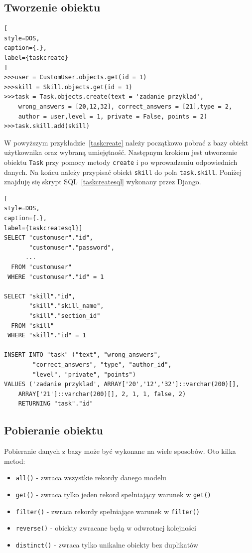 \documentclass[oneside,polski,logo,indent]{amuthesis}
\begin{document}
\begin{center}
\subsection{Tworzenie obiektu}
\end{center}
\begin{lstlisting}[
style=DOS,
caption={.},
label={taskcreate}
]
>>>user = CustomUser.objects.get(id = 1)
>>>skill = Skill.objects.get(id = 1)
>>>task = Task.objects.create(text = 'zadanie przyklad',
	wrong_answers = [20,12,32], correct_answers = [21],type = 2,
	author = user,level = 1, private = False, points = 2)
>>>task.skill.add(skill)

\end{lstlisting}
W powyższym przykładzie~\ref{taskcreate} należy początkowo pobrać z bazy obiekt użytkownika oraz wybraną umiejętność. Następnym krokiem jest utworzenie obiektu \texttt{Task} przy pomocy metody \texttt{create} i po wprowadzeniu odpowiednich danych. Na końcu należy przypisać obiekt \texttt{skill} do pola \texttt{task.skill}. Poniżej znajduję się skrypt SQL~\ref{taskcreatesql} wykonany przez Django.
\begin{lstlisting}[
style=DOS,
caption={.},
label={taskcreatesql}]
SELECT "customuser"."id",
       "customuser"."password",
	  ...
  FROM "customuser"
 WHERE "customuser"."id" = 1

SELECT "skill"."id",
       "skill"."skill_name",
       "skill"."section_id"
  FROM "skill"
 WHERE "skill"."id" = 1

INSERT INTO "task" ("text", "wrong_answers",
		"correct_answers", "type", "author_id",
		"level", "private", "points")
VALUES ('zadanie przyklad', ARRAY['20','12','32']::varchar(200)[],
	ARRAY['21']::varchar(200)[], 2, 1, 1, false, 2) 
	RETURNING "task"."id"
\end{lstlisting}

\begin{center}
\subsection{Pobieranie obiektu}
\end{center}
Pobieranie danych z bazy może być wykonane na wiele sposobów. Oto kilka metod:

\begin{itemize}
\item \texttt{all()} - zwraca wszystkie rekordy danego modelu
\item \texttt{get()} - zwraca tylko jeden rekord spełniający warunek w \texttt{get()}
\item \texttt{filter()} - zwraca rekordy spełniające warunek w \texttt{filter()}
\item \texttt{reverse()} - obiekty zwracane będą w odwrotnej kolejności
\item \texttt{distinct()} - zwraca tylko unikalne obiekty bez duplikatów
\end{itemize}
\end{document}
